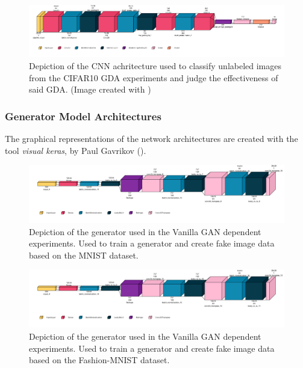 \begin{figure}[htbp]
    \centering
    \vspace{-2em}
    \includegraphics[width=.9\textwidth]{abb/netron_network_archs/classifying_Classifier_Cifar10.png}
    \caption{Depiction of the CNN achritecture used to classify unlabeled images from the CIFAR10 GDA experiments and judge the effectiveness of said GDA. (Image created with )}
    \label{fig:figure_class_cifar10}
\end{figure}
\newpage

\subsubsection{Generator Model Architectures}\label{appendix_generator_architectures}
The graphical representations of the network architectures are created with the tool \textit{visual keras}, by Paul Gavrikov (\cite{Gavrikov2020VisualKeras}).

\begin{figure}[htbp]
    \centering
    \includegraphics[width=.9\textwidth]{abb/netron_network_archs/define_vanilla_mnist_gen.png}
    \caption{Depiction of the generator used in the Vanilla GAN dependent experiments. Used to train a generator and create fake image data based on the MNIST dataset.}
    \label{fig:figure_gen_arch_vanilla_mnist}
\end{figure}

\begin{figure}[htbp]
    \centering
    \includegraphics[width=.9\textwidth]{abb/netron_network_archs/define_vanilla_fashion_mnist_gen.png}
    \caption{Depiction of the generator used in the Vanilla GAN dependent experiments. Used to train a generator and create fake image data based on the Fashion-MNIST dataset.}
    \label{fig:figure_gen_arch_vanilla_fashion}
\end{figure}

